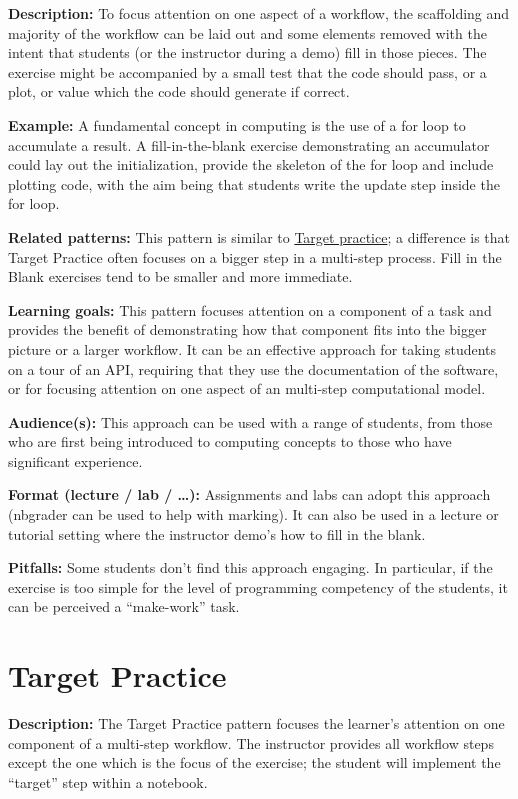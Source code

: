 \documentclass[]{book}
\begin{document}
\textbf{Description:} To focus attention on one aspect of a workflow,
the scaffolding and majority of the workflow can be laid out and some
elements removed with the intent that students (or the instructor during
a demo) fill in those pieces. The exercise might be accompanied by a
small test that the code should pass, or a plot, or value which the code
should generate if correct.

\textbf{Example:} A fundamental concept in computing is the use of a for
loop to accumulate a result. A fill-in-the-blank exercise demonstrating
an accumulator could lay out the initialization, provide the skeleton of
the for loop and include plotting code, with the aim being that students
write the update step inside the for loop.

\textbf{Related patterns:} This pattern is similar to
\protect\hyperlink{target-practice}{Target practice}; a difference is
that Target Practice often focuses on a bigger step in a multi-step
process. Fill in the Blank exercises tend to be smaller and more
immediate.

\textbf{Learning goals:} This pattern focuses attention on a component
of a task and provides the benefit of demonstrating how that component
fits into the bigger picture or a larger workflow. It can be an
effective approach for taking students on a tour of an API, requiring
that they use the documentation of the software, or for focusing
attention on one aspect of an multi-step computational model.

\textbf{Audience(s):} This approach can be used with a range of
students, from those who are first being introduced to computing
concepts to those who have significant experience.

\textbf{Format (lecture / lab / \ldots{}):} Assignments and labs can
adopt this approach (nbgrader can be used to help with marking). It can
also be used in a lecture or tutorial setting where the instructor
demo's how to fill in the blank.

\textbf{Pitfalls:} Some students don't find this approach engaging. In
particular, if the exercise is too simple for the level of programming
competency of the students, it can be perceived a ``make-work'' task.

\hypertarget{target-practice}{\section{Target
Practice}\label{target-practice}}

\textbf{Description:} The Target Practice pattern focuses the learner's
attention on one component of a multi-step workflow. The instructor
provides all workflow steps except the one which is the focus of the
exercise; the student will implement the ``target'' step within a
notebook.
\end{document}
